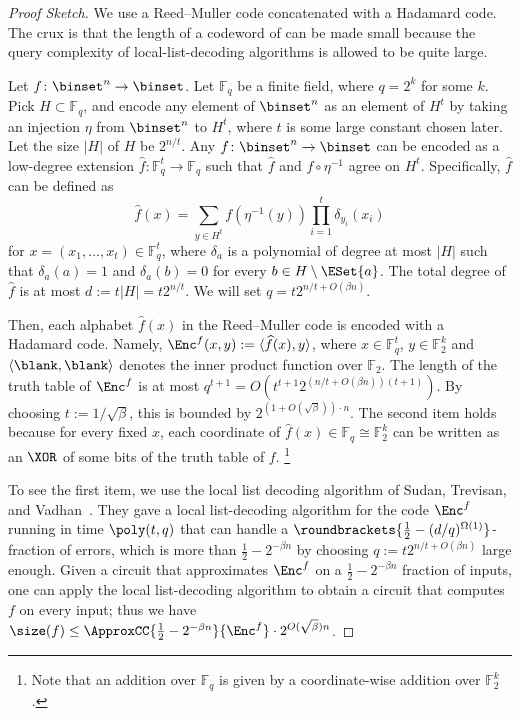 \documentclass[11pt]{article}
\numberwithin{equation}{section}
\theoremstyle{definition}
\theoremstyle{plain}
\begin{document}
\begin{proof}
  [Proof Sketch]
  We use a Reed--Muller code concatenated with a Hadamard code.
  The crux is that the length of a codeword of can be made small because the query complexity of local-list-decoding algorithms is allowed to be quite large.

  Let $f \colon \binset^n \to \binset$.
  Let $\mathbb{F}_{q}$ be a finite field, where $q = 2^k$ for some $k$.
  Pick $H \subset \mathbb{F}_q$, and encode any element of $\binset^n$ as an element of $H^t$
  by taking an injection $\eta$ from $\binset^n$ to $H^t$,
  where $t$ is some large constant chosen later.
  Let the size $|H|$ of $H$ be $2^{n/t}$.
  Any $f \colon \binset^n \to \binset$ can be
  encoded as a low-degree extension $\widehat{f} \colon \mathbb{F}_q^t \to \mathbb{F}_q$
  such that $\widehat{f}$ and $f \circ \eta^{-1}$ agree on $H^t$.
  Specifically, $\widehat{f}$ can be defined as
  \[
    \widehat{f}(x) = \sum_{y \in H^t} f(\eta^{-1}(y)) \prod_{i=1}^t \delta_{y_i} (x_i)
  \]
  for $x = (x_1, \ldots, x_t) \in \mathbb{F}_q^t$,
  where $\delta_a$ is a polynomial of degree at most $|H|$ such that $\delta_a(a) = 1$ and $\delta_a(b) = 0$ for every $b \in H \setminus \ESet{a}$.
  The total degree of $\widehat{f}$ is at most $d := t |H| = t 2^{n / t}$.
  We will set $q = t 2^{n / t + O(\beta n)}$.

  Then, each alphabet $\widehat{f}(x)$ in the Reed--Muller code is encoded with a Hadamard code.
  Namely, $\Enc^f(x, y) := \langle \widehat{f}(x), y \rangle$,
  where $x \in \mathbb{F}_{q}^t $, $y \in \mathbb{F}_2^k$ and $\langle \blank, \blank \rangle$ denotes the inner product function over $\mathbb F_2$.
  The length of the truth table of $\Enc^f$
  is at most $q^{t + 1} = O(t^{t + 1} 2^{(n / t + O(\beta n))(t + 1)})$.
  By choosing $t := 1 / \sqrt{\beta}$, this is bounded by $2^{(1 + O(\sqrt{\beta})) \cdot n}$.
  The second item holds because
  for every fixed $x$,
  each coordinate of $\widehat{f}(x) \in \mathbb{F}_q \cong \mathbb{F}_2^k$
  can be written as an $\XOR$ of some bits of the truth table of $f$.%
  \footnote{Note that an addition over $\mathbb{F}_q$ is given by a coordinate-wise addition over $\mathbb{F}_2^k$.}

  To see the first item, we use the local list decoding algorithm of
  Sudan, Trevisan, and Vadhan~\cite{SudanTV01_jcss_journals}.
  They gave a local list-decoding algorithm for
  the code $\Enc^f$
  running in time $\poly(t, q)$
  that can handle a $\roundbrackets{\frac{1}{2} - (d / q)^{\Omega(1)}}$-fraction of errors,
  which is more than $\frac{1}{2} - 2^{- \beta n}$
  by choosing $q := t 2^{n / t + O(\beta n)}$ large enough.
  Given a circuit that approximates $\Enc^f$ on a $\frac{1}{2} - 2^{- \beta n}$ fraction of inputs,
  one can apply the local list-decoding algorithm to obtain a circuit that computes $f$ on every input;
  thus we have $\size(f) \le \ApproxCC{\frac{1}{2} - 2^{- \beta n}}{\Enc^f} \cdot 2^{O(\sqrt{\beta}) n}$.
\end{proof}
\end{document}
